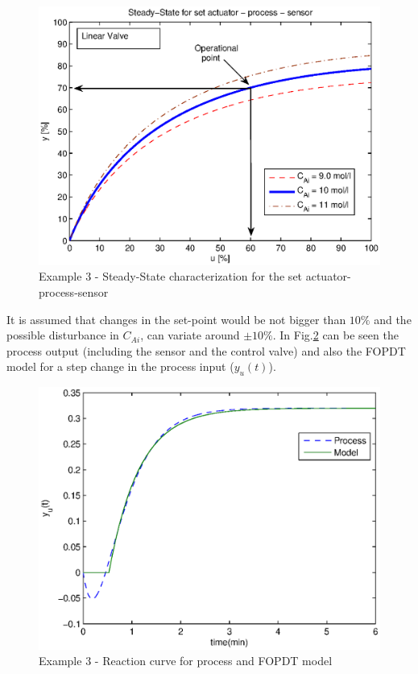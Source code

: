 \begin{figure}[htb!]
    \begin{center}
        \includegraphics[width=0.7\linewidth]{c_estatica2.eps}
        \caption{Example 3 - Steady-State characterization for the set actuator-process-sensor}
        \label{c_estatica2}
    \end{center}
\end{figure}

It is assumed that changes in the set-point would be not bigger
than $10 \%$ and the possible disturbance in $C_{Ai}$, can variate
around $\pm 10 \%$. In Fig.\ref{process} can be seen the process
output (including the sensor and the control valve) and also the
FOPDT model for a step change in the process input ($y_u(t)$).

\begin{figure}[htb!]
    \begin{center}
        \includegraphics[width=0.7\linewidth]{FOPDT.eps}
       \caption{Example 3 - Reaction curve for process and FOPDT model} \label{process}
    \end{center}
\end{figure}

